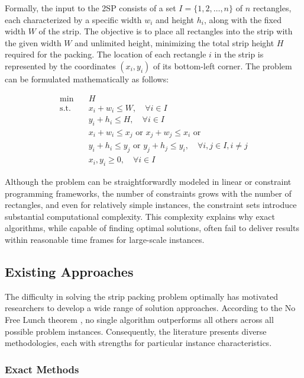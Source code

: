 \documentclass[11pt,a4paper]{article}
\begin{document}
Formally, the input to the 2SP consists of a set $I = \{1, 2, \ldots, n\}$ of $n$ rectangles, each characterized by a specific width $w_i$ and height $h_i$, along with the fixed width $W$ of the strip. The objective is to place all rectangles into the strip with the given width $W$ and unlimited height, minimizing the total strip height $H$ required for the packing. The location of each rectangle $i$ in the strip is represented by the coordinates $(x_i, y_i)$ of its bottom-left corner. The problem can be formulated mathematically as follows:

\begin{align*}
\min \quad & H \\
\text{s.t.} \quad & x_i + w_i \leq W, \quad \forall i \in I \\
& y_i + h_i \leq H, \quad \forall i \in I \\
& x_i + w_i \leq x_j \text{ or } x_j + w_j \leq x_i \text{ or } \\
& y_i + h_i \leq y_j \text{ or } y_j + h_j \leq y_i, \quad \forall i, j \in I, i \neq j \\
& x_i, y_i \geq 0, \quad \forall i \in I
\end{align*}

Although the problem can be straightforwardly modeled in linear or constraint programming frameworks, the number of constraints grows with the number of rectangles, and even for relatively simple instances, the constraint sets introduce substantial computational complexity. This complexity explains why exact algorithms, while capable of finding optimal solutions, often fail to deliver results within reasonable time frames for large-scale instances.

\subsection{Existing Approaches}

The difficulty in solving the strip packing problem optimally has motivated researchers to develop a wide range of solution approaches. According to the No Free Lunch theorem \cite{wolpert1997}, no single algorithm outperforms all others across all possible problem instances. Consequently, the literature presents diverse methodologies, each with strengths for particular instance characteristics.

\subsubsection{Exact Methods}
\end{document}
